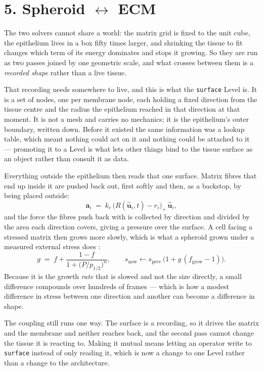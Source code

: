 \documentclass[10pt,a4paper]{article}
\newcommand{\op}[1]{\texttt{#1}}
\begin{document}
\section*{5.\; Spheroid $\leftrightarrow$ ECM}

The two solvers cannot share a world: the matrix grid is fixed to the unit cube, the epithelium lives in
a box fifty times larger, and shrinking the tissue to fit changes which term of its energy dominates and
stops it growing. So they are run as two passes joined by one geometric scale, and what crosses between
them is a \emph{recorded shape} rather than a live tissue.

That recording needs somewhere to live, and this is what the \op{surface} Level is. It is a set of
nodes, one per membrane node, each holding a fixed direction from the tissue centre and the radius the
epithelium reached in that direction at that moment. It is not a mesh and carries no mechanics; it is
the epithelium's outer boundary, written down. Before it existed the same information was a lookup
table, which meant nothing could act on it and nothing could be attached to it --- promoting it to a
Level is what lets other things bind to the tissue surface as an object rather than consult it as data.

Everything outside the epithelium then reads that one surface. Matrix fibres that end up inside it are
pushed back out, first softly and then, as a backstop, by being placed outside:
%
\begin{equation}\mathbf a_i \;=\; k_c\,\bigl(R(\hat{\mathbf u}_i,t)-r_i\bigr)_+\,\hat{\mathbf u}_i,
\label{eq:contact}\end{equation}
%
and the force the fibres push back with is collected by direction and divided by the area each direction
covers, giving a pressure over the surface. A cell facing a stressed matrix then grows more slowly, which is what a spheroid grown under a measured external stress does \cite{helmlinger1997,montel2011}:
%
\begin{equation}g \;=\; f + \frac{1-f}{1+\bigl(P/p_{1/2}\bigr)^{n}},\qquad
 s_{\text{now}} \leftarrow s_{\text{prev}}\,\bigl(1+g\,(f_{\text{grow}}-1)\bigr).
\label{eq:gate}\end{equation}
%
Because it is the growth \emph{rate} that is slowed and not the size directly, a small difference
compounds over hundreds of frames --- which is how a modest difference in stress between one direction
and another can become a difference in shape.

The coupling still runs one way. The surface is a recording, so it drives the matrix and the membrane
and neither reaches back, and the second pass cannot change the tissue it is reacting to. Making it
mutual means letting an operator write to \op{surface} instead of only reading it, which is now a change
to one Level rather than a change to the architecture.
\end{document}
